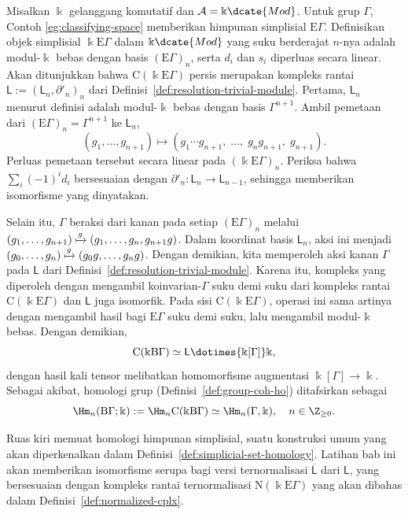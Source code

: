 \begin{example}\label{eg:classifying-space-std-cplx}
	Misalkan $\Bbbk$ gelanggang komutatif dan
	$\mathcal{A}=\Bbbk\dcate{Mod}$. Untuk grup $\Gamma$, Contoh
	\ref{eg:classifying-space} memberikan himpunan simplisial
	$\mathrm{E}\Gamma$. Definisikan objek simplisial
	$\Bbbk\mathrm{E}\Gamma$ dalam $\Bbbk\dcate{Mod}$ yang suku berderajat
	$n$-nya adalah modul-$\Bbbk$ bebas dengan basis
	$(\mathrm{E}\Gamma)_n$, serta $d_i$ dan $s_i$ diperluas secara linear.
	Akan ditunjukkan bahwa $\mathrm{C}(\Bbbk\mathrm{E}\Gamma)$ persis merupakan
	kompleks rantai $\mathsf{L}:=(\mathsf{L}_n,\partial'_n)_n$ dari
	Definisi~\ref{def:resolution-trivial-module}. Pertama,
	$\mathsf{L}_n$ menurut definisi adalah modul-$\Bbbk$ bebas dengan basis
	$\Gamma^{n+1}$. Ambil pemetaan dari
	$(\mathrm{E}\Gamma)_n=\Gamma^{n+1}$ ke $\mathsf{L}_n$,
	\[ \left( g_1, \ldots, g_{n+1} \right) \mapsto \left(g_1 \cdots g_{n+1}, \; \ldots , \; g_n g_{n+1}, \; g_{n+1}\right). \]
	Perluas pemetaan tersebut secara linear pada
	$(\Bbbk\mathrm{E}\Gamma)_n$. Periksa bahwa
	$\sum_i(-1)^id_i$ bersesuaian dengan
	$\partial'_n:\mathsf{L}_n\to\mathsf{L}_{n-1}$, sehingga memberikan
	isomorfisme yang dinyatakan.

	Selain itu, $\Gamma$ beraksi dari kanan pada setiap
	$(\mathrm{E}\Gamma)_n$ melalui
	$(g_1,\ldots,g_{n+1})\xmapsto{g}(g_1,\ldots,g_n,g_{n+1}g)$. Dalam koordinat
	basis $\mathsf{L}_n$, aksi ini menjadi
	$(g_0,\ldots,g_n)\xmapsto{g}(g_0g,\ldots,g_ng)$. Dengan demikian, kita
	memperoleh aksi kanan $\Gamma$ pada $\mathsf{L}$ dari
	Definisi~\ref{def:resolution-trivial-module}. Karena itu, kompleks yang
	diperoleh dengan mengambil koinvarian-$\Gamma$ suku demi suku dari
	kompleks rantai
	$\mathrm{C}(\Bbbk\mathrm{E}\Gamma)$ dan $\mathsf{L}$ juga isomorfik.
	Pada sisi $\mathrm{C}(\Bbbk\mathrm{E}\Gamma)$, operasi ini sama artinya
	dengan mengambil hasil bagi $\mathrm{E}\Gamma$ suku demi suku, lalu
	mengambil modul-$\Bbbk$ bebas. Dengan demikian,
	\[ \mathrm{C}(\Bbbk\mathrm{B}\Gamma) \simeq \mathsf{L} \dotimes{\Bbbk[\Gamma]} \Bbbk, \]
	dengan hasil kali tensor melibatkan homomorfisme augmentasi
	$\Bbbk[\Gamma]\to\Bbbk$. Sebagai akibat, homologi grup
	(Definisi~\ref{def:group-coh-ho}) ditafsirkan sebagai
	\[ \Hm_n(\mathrm{B}\Gamma; \Bbbk) := \Hm_n \mathrm{C}(\Bbbk\mathrm{B}\Gamma) \simeq \Hm_n(\Gamma, \Bbbk), \quad n \in \Z_{\geq 0}. \]

	Ruas kiri memuat homologi himpunan simplisial, suatu konstruksi umum yang
	akan diperkenalkan dalam Definisi~\ref{def:simplicial-set-homology}.
	Latihan bab ini akan memberikan isomorfisme serupa bagi versi ternormalisasi
	$\overline{\mathsf{L}}$ dari $\mathsf{L}$, yang bersesuaian dengan
	kompleks rantai ternormalisasi
	$\mathrm{N}(\Bbbk\mathrm{E}\Gamma)$ yang akan dibahas dalam
	Definisi~\ref{def:normalized-cplx}.
\end{example}

